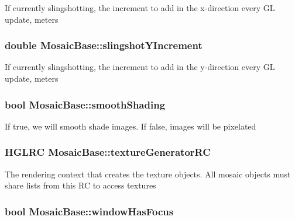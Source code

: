 \label{class_mosaic_base_a1a8e2dce7bdb32457491c8037e72001e}
If currently slingshotting, the increment to add in the x-\/direction every GL update, meters \hypertarget{class_mosaic_base_ac9782032891a2795ebd2a6e54c6e4ad9}{
\subsubsection[{slingshotYIncrement}]{\setlength{\rightskip}{0pt plus 5cm}double {\bf MosaicBase::slingshotYIncrement}}}
\label{class_mosaic_base_ac9782032891a2795ebd2a6e54c6e4ad9}
If currently slingshotting, the increment to add in the y-\/direction every GL update, meters \hypertarget{class_mosaic_base_a4533c102656a9ea23c248740eca72bc2}{
\subsubsection[{smoothShading}]{\setlength{\rightskip}{0pt plus 5cm}bool {\bf MosaicBase::smoothShading}}}
\label{class_mosaic_base_a4533c102656a9ea23c248740eca72bc2}
If true, we will smooth shade images. If false, images will be pixelated \hypertarget{class_mosaic_base_a450fb048b4345e6547721b3e14f07176}{
\subsubsection[{textureGeneratorRC}]{\setlength{\rightskip}{0pt plus 5cm}HGLRC {\bf MosaicBase::textureGeneratorRC}}}
\label{class_mosaic_base_a450fb048b4345e6547721b3e14f07176}
The rendering context that creates the texture objects. All mosaic objects must share lists from this RC to access textures \hypertarget{class_mosaic_base_a2c756e948372a8b472527b20fd80c6b6}{
\subsubsection[{windowHasFocus}]{\setlength{\rightskip}{0pt plus 5cm}bool {\bf MosaicBase::windowHasFocus}}}
